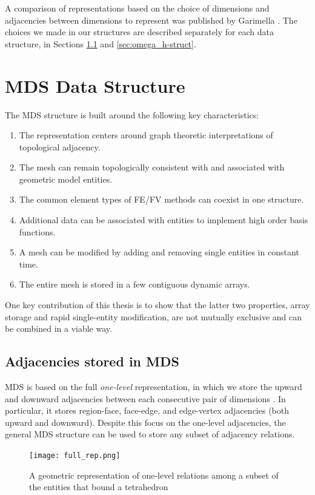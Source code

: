 A comparison of representations based on the choice
of dimensions and adjacencies between
dimensions to represent
was published by Garimella \cite{garimella2002mesh}.
The choices we made in our structures are described separately
for each data structure,
in Sections \ref{sec:mds_adj} and \ref{sec:omega_h-struct}.

\section{MDS Data Structure}
\label{sec:sisc}

The MDS structure is built around the following key characteristics:

\begin{enumerate}
\item The representation centers around graph theoretic interpretations
of topological adjacency.
\item The mesh can remain topologically consistent with and associated with
geometric model entities.
\item The common element types of FE/FV methods can coexist in one structure.
\item Additional data can be associated with entities to implement
high order basis functions.
\item A mesh can be modified by adding and removing single entities in constant time.
\item The entire mesh is stored in a few contiguous dynamic arrays.
\end{enumerate}

One key contribution of this thesis is to show that the latter two properties,
array storage and rapid single-entity modification, are not mutually exclusive
and can be combined in a viable way.

\subsection{Adjacencies stored in MDS}
\label{sec:mds_adj}

MDS is based on the full {\it one-level} representation,
in which we store the upward
and downward adjacencies between each consecutive
pair of dimensions \cite{beall1997general}.
In particular, it stores
region-face, face-edge, and edge-vertex adjacencies
(both upward and downward).
Despite this focus on the one-level adjacencies, the general MDS
structure can be used to store any subset of
adjacency relations.

\begin{figure}
\begin{center}
\texttt{[image: full\_rep.png]}
\caption{A geometric representation of one-level
relations among a subset of the entities that bound a tetrahedron}
\label{fig:mds_topo}
\end{center}
\end{figure}

